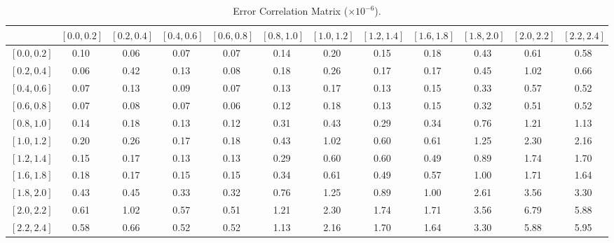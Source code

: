 \begin{table}[htbp]
  \begin{center}
    \begin{tabular}{l | c c c c c c c c c c c}
& \scriptsize{$\left[0.0,0.2\right]$}
& \scriptsize{$\left[0.2,0.4\right]$}
& \scriptsize{$\left[0.4,0.6\right]$}
& \scriptsize{$\left[0.6,0.8\right]$}
& \scriptsize{$\left[0.8,1.0\right]$}
& \scriptsize{$\left[1.0,1.2\right]$}
& \scriptsize{$\left[1.2,1.4\right]$}
& \scriptsize{$\left[1.6,1.8\right]$}
& \scriptsize{$\left[1.8,2.0\right]$}
& \scriptsize{$\left[2.0,2.2\right]$}
& \scriptsize{$\left[2.2,2.4\right]$} \\ \hline

\scriptsize{$\left[0.0,0.2\right]$} &0.10 & 0.06 & 0.07 & 0.07 & 0.14 & 0.20 & 0.15 & 0.18 & 0.43 & 0.61 & 0.58 \\
\scriptsize{$\left[0.2,0.4\right]$} &0.06 & 0.42 & 0.13 & 0.08 & 0.18 & 0.26 & 0.17 & 0.17 & 0.45 & 1.02 & 0.66 \\
\scriptsize{$\left[0.4,0.6\right]$} &0.07 & 0.13 & 0.09 & 0.07 & 0.13 & 0.17 & 0.13 & 0.15 & 0.33 & 0.57 & 0.52 \\
\scriptsize{$\left[0.6,0.8\right]$} &0.07 & 0.08 & 0.07 & 0.06 & 0.12 & 0.18 & 0.13 & 0.15 & 0.32 & 0.51 & 0.52 \\
\scriptsize{$\left[0.8,1.0\right]$} &0.14 & 0.18 & 0.13 & 0.12 & 0.31 & 0.43 & 0.29 & 0.34 & 0.76 & 1.21 & 1.13 \\
\scriptsize{$\left[1.0,1.2\right]$} &0.20 & 0.26 & 0.17 & 0.18 & 0.43 & 1.02 & 0.60 & 0.61 & 1.25 & 2.30 & 2.16 \\
\scriptsize{$\left[1.2,1.4\right]$} &0.15 & 0.17 & 0.13 & 0.13 & 0.29 & 0.60 & 0.60 & 0.49 & 0.89 & 1.74 & 1.70 \\
\scriptsize{$\left[1.6,1.8\right]$} &0.18 & 0.17 & 0.15 & 0.15 & 0.34 & 0.61 & 0.49 & 0.57 & 1.00 & 1.71 & 1.64 \\
\scriptsize{$\left[1.8,2.0\right]$} &0.43 & 0.45 & 0.33 & 0.32 & 0.76 & 1.25 & 0.89 & 1.00 & 2.61 & 3.56 & 3.30 \\
\scriptsize{$\left[2.0,2.2\right]$} &0.61 & 1.02 & 0.57 & 0.51 & 1.21 & 2.30 & 1.74 & 1.71 & 3.56 & 6.79 & 5.88 \\
\scriptsize{$\left[2.2,2.4\right]$} &0.58 & 0.66 & 0.52 & 0.52 & 1.13 & 2.16 & 1.70 & 1.64 & 3.30 & 5.88 & 5.95 \\
    \end{tabular}
    \caption{\label{tab:covMatrix}Error Correlation Matrix ($\times 10^{-6}$).}
  \end{center}
\end{table}



